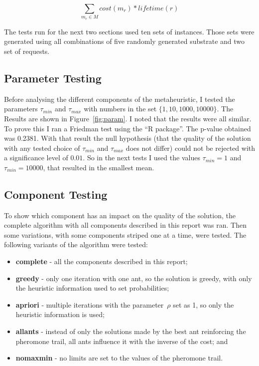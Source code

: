 \documentclass[10pt, a4paper, twocolumn]{article}
\begin{document}
\begin{equation}
  \sum_{m_{r} \in M} cost(m_{r}) * lifetime(r)
\end{equation}

The tests run for the next two sections used ten sets of instances. Those sets were generated using all combinations of five randomly generated substrate and two set of requests.

\subsection{Parameter Testing}\label{sec:param}
Before analysing the different components of the metaheuristic, I tested the parameters $\tau_{min}$ and $\tau_{max}$ with numbers in the set $\{1, 10, 1000, 10000\}$. The Results are shown in Figure~\ref{fig:param}. I noted that the results were all similar. To prove this I ran a Friedman test using the ``R package''. The p-value obtained was 0.2381. With that result the null hypothesis (that the quality of the solution with any tested choice of $\tau_{min}$ and $\tau_{max}$ does not differ) could not be rejected with a significance level of $0.01$. So in the next tests I used the values $\tau_{min} = 1$ and $\tau_{min} = 10000$, that resulted in the smallest mean.

\subsection{Component Testing}
To show which component has an impact on the quality of the solution, the complete algorithm with all components described in this report was ran. Then some variations, with some components striped one at a time, were tested. The following variants of the algorithm were tested:

\begin{itemize}
  \item \textbf{complete} - all the components described in this report;
  \item \textbf{greedy} - only one iteration with one ant, so the solution is greedy, with only the heuristic information used to set probabilities;
  \item \textbf{apriori} - multiple iterations with the parameter~$\rho$ set as 1, so only the heuristic information is used;
  \item \textbf{allants} - instead of only the solutions made by the best ant reinforcing the pheromone trail, all ants influence it with the inverse of the cost; and
  \item \textbf{nomaxmin} - no limits are set to the values of the pheromone trail.
\end{itemize}
\end{document}
